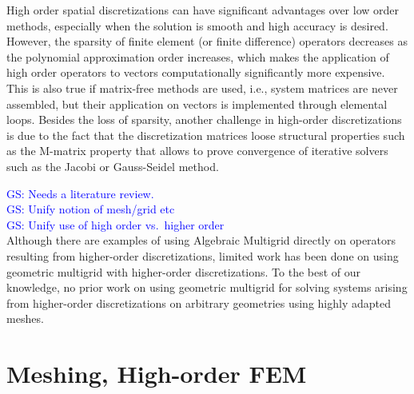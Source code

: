 \documentclass[times]{nlaauth}
\newcommand{\gsnote}[1]{\textcolor{blue}{GS: #1}}
\begin{document}
High order spatial discretizations can have significant advantages
over low order methods, especially when the solution is smooth and
high accuracy is desired. However, the sparsity of finite element (or
finite difference) operators decreases as the polynomial approximation
order increases, which makes the application of high order operators
to vectors computationally significantly more expensive. This is also
true if matrix-free methods are used, i.e., system matrices are never
assembled, but their application on vectors is implemented through
elemental loops.  Besides the loss of sparsity, another challenge in
high-order discretizations is due to the fact that the discretization
matrices loose structural properties such as the M-matrix property
that allows to prove convergence of iterative solvers such as the
Jacobi or Gauss-Seidel method.

\noindent
\gsnote{Needs a literature review.}\\
\gsnote{Unify notion of mesh/grid etc}\\
\gsnote{Unify use of high order vs.\ higher order}\\
Although there are examples of using Algebraic Multigrid directly on
operators resulting from higher-order discretizations, limited work
has been done on using geometric multigrid with higher-order
discretizations. To the best of our knowledge, no prior work on using
geometric multigrid for solving systems arising from higher-order
discretizations on arbitrary geometries using highly adapted meshes.






\section{Meshing, High-order FEM}
\end{document}
